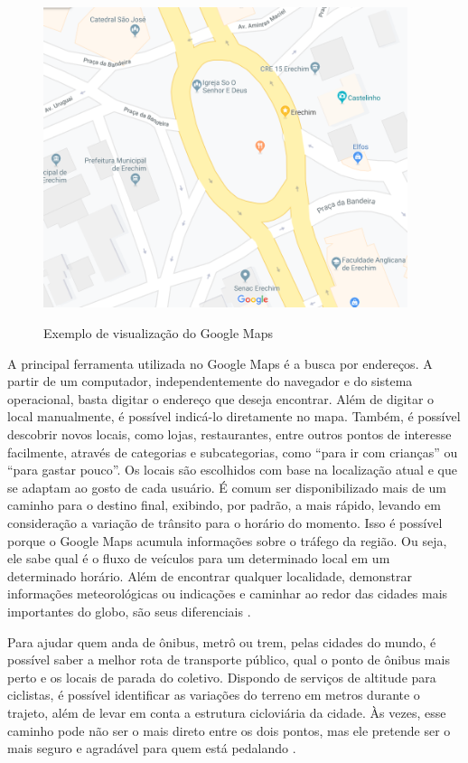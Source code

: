 \begin{figure}[H]
    \centering
    \caption{Exemplo de visualização do Google Maps}
    \includegraphics[width=0.95\textwidth]{./dados/figuras/fig4}
    \label{fig:figura-googlemaps}
\end{figure}

A principal ferramenta utilizada no Google Maps é a busca por endereços. A partir de um computador, independentemente do navegador e do sistema operacional, basta digitar o endereço que deseja encontrar. Além de digitar o local manualmente, é possível indicá-lo diretamente no mapa. Também, é possível descobrir novos locais, como lojas, restaurantes, entre outros pontos de interesse facilmente, através de categorias e subcategorias, como “para ir com crianças” ou “para gastar pouco”. Os locais são escolhidos com base na localização atual e que se adaptam ao gosto de cada usuário. É comum ser disponibilizado mais de um caminho para o destino final, exibindo, por padrão, a mais rápido, levando em consideração a variação de trânsito para o horário do momento. Isso é possível porque o Google Maps acumula informações sobre o tráfego da região. Ou seja, ele sabe qual é o fluxo de veículos para um determinado local em um determinado horário. Além de encontrar qualquer localidade, demonstrar informações meteorológicas ou indicações e caminhar ao redor das cidades mais importantes do globo, são seus diferenciais \cite{google:2019}.

\newpage
Para ajudar quem anda de ônibus, metrô ou trem, pelas cidades do mundo, é possível saber a melhor rota de transporte público, qual o ponto de ônibus mais perto e os locais de parada do coletivo. Dispondo de serviços de altitude para ciclistas, é possível identificar as variações do terreno em metros durante o trajeto, além de levar em conta a estrutura cicloviária da cidade. Às vezes, esse caminho pode não ser o mais direto entre os dois pontos, mas ele pretende ser o mais seguro e agradável para quem está pedalando \cite{google:2019}.

